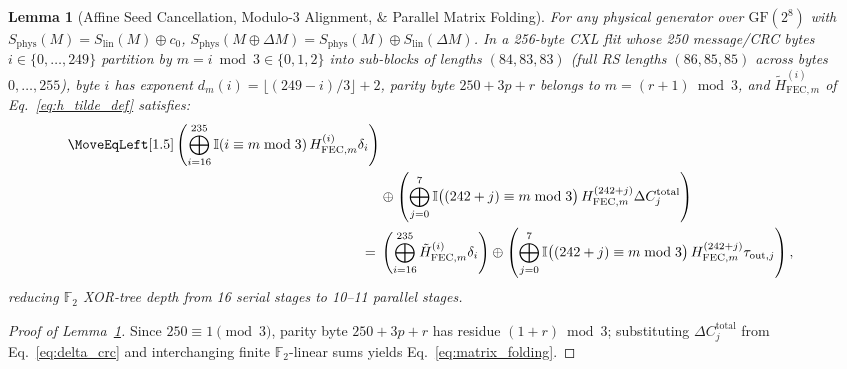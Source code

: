 \documentclass[11pt,letterpaper]{article}
\theoremstyle{spectralthm}
\newtheorem{lemma}[theorem]{Lemma}
\begin{document}
\begin{lemma}[Affine Seed Cancellation, Modulo-3 Alignment, \& Parallel Matrix Folding]
\label{lem:folding}
For any physical generator over $\mathrm{GF}(2^8)$ with $S_{\mathrm{phys}}(M) = S_{\mathrm{lin}}(M) \oplus c_0$, $S_{\mathrm{phys}}(M \oplus \Delta M) = S_{\mathrm{phys}}(M) \oplus S_{\mathrm{lin}}(\Delta M)$. In a 256-byte CXL flit whose 250 message/CRC bytes $i \in \{0,\ldots,249\}$ partition by $m = i \bmod 3 \in \{0,1,2\}$ into sub-blocks of lengths $(84, 83, 83)$ (full RS lengths $(86, 85, 85)$ across bytes $0,\ldots,255$), byte $i$ has exponent $d_m(i) = \lfloor (249-i)/3 \rfloor + 2$, parity byte $250 + 3p + r$ belongs to $m = (r+1) \bmod 3$, and $\tilde{H}_{\mathrm{FEC},m}^{(i)}$ of Eq.~\eqref{eq:h_tilde_def} satisfies:
\begin{equation}
\label{eq:matrix_folding}
\begin{aligned}
\MoveEqLeft[1.5] \left(\bigoplus_{i=16}^{235}\mathbb{I}(i \equiv m \bmod 3)\, H_{\mathrm{FEC},m}^{(i)} \delta_i\right) \\
&\oplus \left(\bigoplus_{j=0}^{7}\mathbb{I}\bigl((242+j) \equiv m \bmod 3\bigr)\, H_{\mathrm{FEC},m}^{(242+j)} \Delta C_j^{\mathrm{total}}\right) \\
=\;& \left(\bigoplus_{i=16}^{235} \tilde{H}_{\mathrm{FEC},m}^{(i)} \delta_i\right)
  \oplus \left(\bigoplus_{j=0}^{7}\mathbb{I}\bigl((242+j) \equiv m \bmod 3\bigr)\, H_{\mathrm{FEC},m}^{(242+j)} \tau_{\mathrm{out},j}\right),
\end{aligned}
\end{equation}
reducing $\mathbb{F}_2$ XOR-tree depth from 16 serial stages to 10--11 parallel stages.
\end{lemma}
\begin{proof}[Proof of Lemma~\ref{lem:folding}]
Since $250 \equiv 1 \pmod 3$, parity byte $250 + 3p + r$ has residue $(1+r) \bmod 3$; substituting $\Delta C_j^{\mathrm{total}}$ from Eq.~\eqref{eq:delta_crc} and interchanging finite $\mathbb{F}_2$-linear sums yields Eq.~\eqref{eq:matrix_folding}.
\end{proof}
\end{document}
